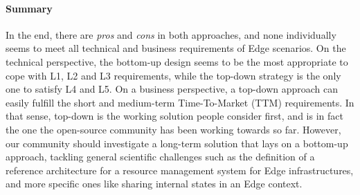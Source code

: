 \paragraph{Summary}
In the end, there are \emph{pros} and \emph{cons} in both approaches,
and none individually seems to meet all technical and business
requirements of Edge scenarios.
On the technical perspective, the bottom-up
design seems to be the most appropriate to cope with L1, L2 and L3
requirements, while the top-down strategy is the only one to satisfy L4
and L5.
%
On a business perspective, a top-down approach can easily fulfill the
short and medium-term Time-To-Market (TTM) requirements. In that
sense, top-down is the working solution people consider first, and is
in fact the one the open-source community has been working towards so
far. However, our community should investigate a long-term solution
that lays on a bottom-up approach, tackling general scientific
challenges such as the definition of a reference architecture for a
resource management system for Edge infrastructures, and more specific
ones like sharing internal states in an Edge context.










